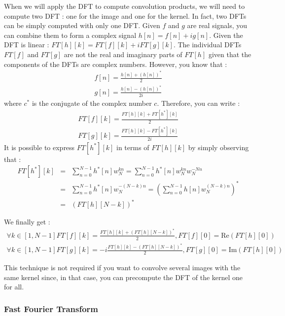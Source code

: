 \documentclass[a4paper,10pt,twoside]{article}
\begin{document}
When we will apply the DFT to compute convolution products, we will need to compute two DFT : one for the image and one for the kernel. In fact, two DFTs can be simply computed with only one DFT. Given $f$ and $g$ are real signals, you can combine them to form a complex signal $h[n] = f[n] + i g[n]$. Given the DFT is linear : $FT[h][k] = FT[f][k] + i FT[g][k]$. The individual DFTs $FT[f]$ and $FT[g]$ are not the real and imaginary parts of $FT[h]$ given that the components of the DFTs are complex numbers. However, you know that :
\begin{eqnarray}
\nonumber f[n] = \frac{h[n] + (h[n])^*}{2} \\
\nonumber g[n] = \frac{h[n] - (h[n])^*}{2i} 
\end{eqnarray}
where $c^*$ is the conjugate of the complex number $c$. Therefore, you can write :
\begin{eqnarray}
\nonumber FT[f][k] = \frac{FT[h][k] + FT[h^*][k]}{2} \\
\nonumber FT[g][k] = \frac{FT[h][k] - FT[h^*][k]}{2i} 
\end{eqnarray}
It is possible to express $FT[h^*][k]$ in terms of $FT[h][k]$ by simply observing that :
\begin{eqnarray}
\nonumber FT[h^*][k] &=& \sum_{n=0}^{N-1} h^*[n] w_N^{k n} = \sum_{n=0}^{N-1} h^*[n] w_N^{k n}w_N^{-N n}\\
\nonumber            &=& \sum_{n=0}^{N-1} h^*[n] w_N^{-(N-k) n} = (\sum_{n=0}^{N-1} h[n] w_N^{(N-k) n})^*\\
\nonumber            &=& (FT[h][N-k])^*
\end{eqnarray}

We finally get :
\begin{eqnarray}
\nonumber \forall k \in [1, N-1] FT[f][k] = \frac{FT[h][k] + (FT[h][N-k])^*}{2} , FT[f][0] = \mbox{Re}(FT[h][0])\\
\nonumber \forall k \in [1, N-1] FT[g][k] = -i\frac{FT[h][k] - (FT[h][N-k])^*}{2}, FT[g][0] = \mbox{Im}(FT[h][0])
\end{eqnarray}

This technique is not required if you want to convolve several images with the same kernel since, in that case, you can precompute the DFT of the kernel one for all.

\subsubsection{Fast Fourier Transform}
\end{document}
